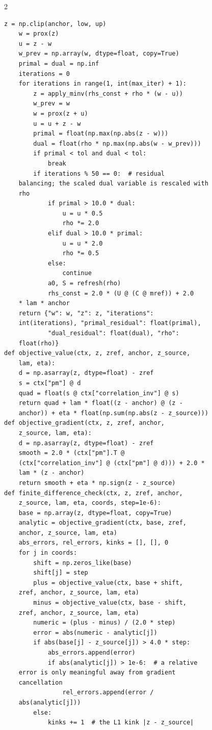 \begin{multicols}{2}
\begin{Verbatim}[fontsize=\scriptsize]
    z = np.clip(anchor, low, up)
    w = prox(z)
    u = z - w
    w_prev = np.array(w, dtype=float, copy=True)
    primal = dual = np.inf
    iterations = 0
    for iterations in range(1, int(max_iter) + 1):
        z = apply_minv(rhs_const + rho * (w - u))
        w_prev = w
        w = prox(z + u)
        u = u + z - w
        primal = float(np.max(np.abs(z - w)))
        dual = float(rho * np.max(np.abs(w - w_prev)))
        if primal < tol and dual < tol:
            break
        if iterations % 50 == 0:  # residual
    balancing; the scaled dual variable is rescaled with
    rho
            if primal > 10.0 * dual:
                u = u * 0.5
                rho *= 2.0
            elif dual > 10.0 * primal:
                u = u * 2.0
                rho *= 0.5
            else:
                continue
            a0, S = refresh(rho)
            rhs_const = 2.0 * (U @ (C @ mref)) + 2.0
    * lam * anchor
    return {"w": w, "z": z, "iterations":
    int(iterations), "primal_residual": float(primal),
            "dual_residual": float(dual), "rho":
    float(rho)}
def objective_value(ctx, z, zref, anchor, z_source,
    lam, eta):
    d = np.asarray(z, dtype=float) - zref
    s = ctx["pm"] @ d
    quad = float(s @ ctx["correlation_inv"] @ s)
    return quad + lam * float((z - anchor) @ (z -
    anchor)) + eta * float(np.sum(np.abs(z - z_source)))
def objective_gradient(ctx, z, zref, anchor,
    z_source, lam, eta):
    d = np.asarray(z, dtype=float) - zref
    smooth = 2.0 * (ctx["pm"].T @
    (ctx["correlation_inv"] @ (ctx["pm"] @ d))) + 2.0 *
    lam * (z - anchor)
    return smooth + eta * np.sign(z - z_source)
def finite_difference_check(ctx, z, zref, anchor,
    z_source, lam, eta, coords, step=1e-6):
    base = np.array(z, dtype=float, copy=True)
    analytic = objective_gradient(ctx, base, zref,
    anchor, z_source, lam, eta)
    abs_errors, rel_errors, kinks = [], [], 0
    for j in coords:
        shift = np.zeros_like(base)
        shift[j] = step
        plus = objective_value(ctx, base + shift,
    zref, anchor, z_source, lam, eta)
        minus = objective_value(ctx, base - shift,
    zref, anchor, z_source, lam, eta)
        numeric = (plus - minus) / (2.0 * step)
        error = abs(numeric - analytic[j])
        if abs(base[j] - z_source[j]) > 4.0 * step:
            abs_errors.append(error)
            if abs(analytic[j]) > 1e-6:  # a relative
    error is only meaningful away from gradient
    cancellation
                rel_errors.append(error /
    abs(analytic[j]))
        else:
            kinks += 1  # the L1 kink |z - z_source|

\end{Verbatim}
\end{multicols}
